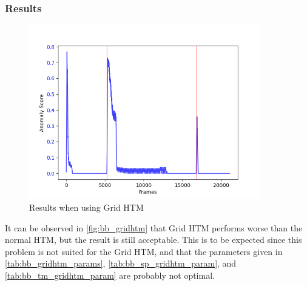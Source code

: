 \subsubsection{Results}
\begin{figure}[H]
    \centering
    \includegraphics[width=0.9\textwidth]{resources/experiments/bouncing_ball/bb_grid}
    \caption{Results when using Grid HTM}
    \label{fig:bb_gridhtm}
\end{figure}
It can be observed in \autoref{fig:bb_gridhtm} that Grid HTM performs worse than the normal HTM, but the result is still acceptable. This is to be expected since this problem is not suited for the Grid HTM, and that the parameters given in \autoref{tab:bb_gridhtm_params}, \autoref{tab:bb_sp_gridhtm_param}, and \autoref{tab:bb_tm_gridhtm_param} are probably not optimal.
